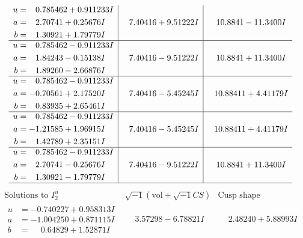 \documentclass[1p]{elsarticle_modified}
\theoremstyle{definition}
\newcommand{\I}{\sqrt{-1}}
\begin{document}
$$\begin{array}{c|c|c}
\begin{aligned}
u &= \phantom{-}0.785462 + 0.911233 I \\
a &= \phantom{-}2.70741 + 0.25676 I \\
b &= \phantom{-}1.30921 + 1.79779 I\end{aligned}
 & \phantom{-}7.40416 + 9.51222 I & \phantom{-}10.8841 - 11.3400 I \\ \hline\begin{aligned}
u &= \phantom{-}0.785462 - 0.911233 I \\
a &= \phantom{-}1.84243 - 0.15138 I \\
b &= \phantom{-}1.89260 - 2.66876 I\end{aligned}
 & \phantom{-}7.40416 - 9.51222 I & \phantom{-}10.8841 + 11.3400 I \\ \hline\begin{aligned}
u &= \phantom{-}0.785462 - 0.911233 I \\
a &= -0.70561 + 2.17520 I \\
b &= \phantom{-}0.83935 + 2.65461 I\end{aligned}
 & \phantom{-}7.40416 - 5.45245 I & \phantom{-}10.88411 + 4.41179 I \\ \hline\begin{aligned}
u &= \phantom{-}0.785462 - 0.911233 I \\
a &= -1.21585 + 1.96915 I \\
b &= \phantom{-}1.42789 + 2.35151 I\end{aligned}
 & \phantom{-}7.40416 - 5.45245 I & \phantom{-}10.88411 + 4.41179 I \\ \hline\begin{aligned}
u &= \phantom{-}0.785462 - 0.911233 I \\
a &= \phantom{-}2.70741 - 0.25676 I \\
b &= \phantom{-}1.30921 - 1.79779 I\end{aligned}
 & \phantom{-}7.40416 - 9.51222 I & \phantom{-}10.8841 + 11.3400 I\\
 \hline 
 \end{array}$$\newpage$$\begin{array}{c|c|c}  
\text{Solutions to }I^u_{2}& \I (\text{vol} + \sqrt{-1}CS) & \text{Cusp shape}\\
 \hline 
\begin{aligned}
u &= -0.740227 + 0.958313 I \\
a &= -1.004250 + 0.871115 I \\
b &= \phantom{-}0.64829 + 1.52871 I\end{aligned}
 & \phantom{-}3.57298 - 6.78821 I & \phantom{-}2.48240 + 5.88993 I \\ \hline\begin{aligned}

\end{aligned}
\end{array}$$
\end{document}
